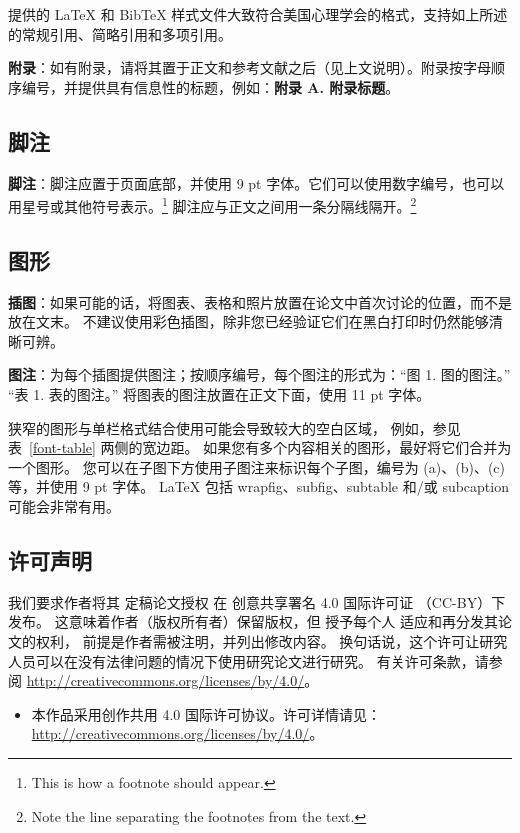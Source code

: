 \documentclass[11pt]{article}
\begin{document}
提供的 \LaTeX{} 和 Bib\TeX{} 样式文件大致符合美国心理学会的格式，支持如上所述的常规引用、简略引用和多项引用。

{\bf 附录}：如有附录，请将其置于正文和参考文献之后（见上文说明）。附录按字母顺序编号，并提供具有信息性的标题，例如：{\bf 附录 A. 附录标题}。
\subsection{脚注}

{\bf 脚注}：脚注应置于页面底部，并使用 9 pt 字体。它们可以使用数字编号，也可以用星号或其他符号表示。\footnote{This is how a footnote should appear.} 脚注应与正文之间用一条分隔线隔开。\footnote{Note the line separating the footnotes from the text.}
\subsection{图形}

{\bf 插图}：如果可能的话，将图表、表格和照片放置在论文中首次讨论的位置，而不是放在文末。
不建议使用彩色插图，除非您已经验证它们在黑白打印时仍然能够清晰可辨。

{\bf 图注}：为每个插图提供图注；按顺序编号，每个图注的形式为：“图 1. 图的图注。” “表 1. 表的图注。” 将图表的图注放置在正文下面，使用 11 pt 字体。

狭窄的图形与单栏格式结合使用可能会导致较大的空白区域， 
例如，参见表~\ref{font-table} 两侧的宽边距。
如果您有多个内容相关的图形，最好将它们合并为一个图形。
您可以在子图下方使用子图注来标识每个子图，编号为 (a)、(b)、(c) 等，并使用 9 pt 字体。
\LaTeX{} 包括 wrapfig、subfig、subtable 和/或 subcaption 可能会非常有用。
\subsection{许可声明}
\label{licence}

我们要求作者将其
定稿论文授权
在
创意共享署名 4.0 国际许可证
（CC-BY）下发布。
这意味着作者（版权所有者）保留版权，但
授予每个人
适应和再分发其论文的权利，
前提是作者需被注明，并列出修改内容。
换句话说，这个许可让研究人员可以在没有法律问题的情况下使用研究论文进行研究。
有关许可条款，请参阅
\url{http://creativecommons.org/licenses/by/4.0/}。

\begin{itemize}
    \item 本作品采用创作共用 4.0 国际许可协议。许可详情请见：\url{http://creativecommons.org/licenses/by/4.0/}。

\end{itemize}
\end{document}
